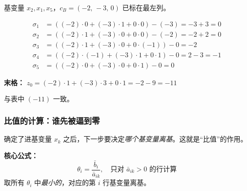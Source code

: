 {基变量 $x_2, x_1, x_5$，$c_B = (-2,\,-3,\,0)$ 已标在最左列。

\small
\[
\begin{aligned}
\sigma_1 &= ((-2)\!\cdot\!0 + (-3)\!\cdot\!1 + 0\!\cdot\!0) - (-3) = -3+3 = 0 \\
\sigma_2 &= ((-2)\!\cdot\!1 + (-3)\!\cdot\!0 + 0\!\cdot\!0) - (-2) = -2+2 = 0 \\
\sigma_3 &= ((-2)\!\cdot\!1 + (-3)\!\cdot\!0 + 0\!\cdot\!(-1)) - 0 = -2 \\
\sigma_4 &= ((-2)\!\cdot\!(-1) + (-3)\!\cdot\!1 + 0\!\cdot\!1) - 0 = 2-3 = -1 \\
\sigma_5 &= ((-2)\!\cdot\!0 + (-3)\!\cdot\!0 + 0\!\cdot\!1) - 0 = 0
\end{aligned}
\]

\textbf{末格：}\;
$z_0 = (-2)\!\cdot\!1 + (-3)\!\cdot\!3 + 0\!\cdot\!1 = -2-9 = -11$
\normalsize

与表中 $(-11)$ 一致。}

\medskip
{}

\subsubsection{比值的计算：谁先被逼到零}

确定了进基变量 $x_k$ 之后，下一步要决定\emph{哪个基变量离基}。这就是“比值”的作用。

\textbf{核心公式：}
\[
\theta_i = \frac{\bar{b}_i}{\bar{a}_{ik}}, \quad \text{只对 } \bar{a}_{ik} > 0 \text{ 的行计算}
\]
取所有 $\theta_i$ 中\emph{最小的}，对应的第 $i$ 行基变量离基。

